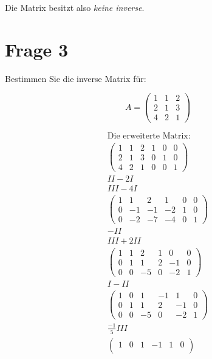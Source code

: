Die Matrix besitzt also \textit{keine inverse}.

\section{Frage 3}

Bestimmen Sie die inverse Matrix für:

\[
    A = \begin{pmatrix}
        1 & 1 & 2 \\
        2 & 1 & 3 \\
        4 & 2 & 1
    \end{pmatrix}
\]

\begin{align*}
    \text{Die erweiterte Matrix:} \\
    \begin{pmatrix}
        1 & 1 & 2 & 1 & 0 & 0 \\
        2 & 1 & 3 & 0 & 1 & 0 \\
        4 & 2 & 1 & 0 & 0 & 1
    \end{pmatrix} \\
    II - 2I \\
    III - 4I \\
    \begin{pmatrix}
        1 & 1 & 2 & 1 & 0 & 0 \\
        0 & -1 & -1 & -2 & 1 & 0 \\
        0 & -2 & -7 & -4 & 0 & 1
    \end{pmatrix} \\
    -II \\
    III + 2II \\
    \begin{pmatrix}
        1 & 1 & 2 & 1 & 0 & 0 \\
        0 & 1 & 1 & 2 & -1 & 0 \\
        0 & 0 & -5 & 0 & -2 & 1
    \end{pmatrix} \\
    I - II \\
    \begin{pmatrix}
        1 & 0 & 1 & -1 & 1 & 0 \\
        0 & 1 & 1 & 2 & -1 & 0 \\
        0 & 0 & -5 & 0 & -2 & 1
    \end{pmatrix} \\
    \frac{-1}{5}III \\
    \begin{pmatrix}
        1 & 0 & 1 & -1 & 1 & 0 \\

\end{pmatrix}
\end{align*}
